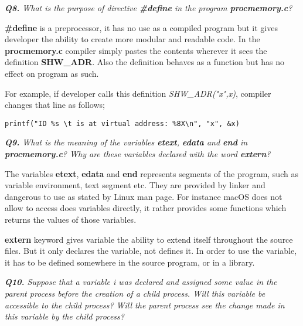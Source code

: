 \documentclass[11pt]{article}
\begin{document}
\vspace{5mm}
\textit{\textbf{Q8.} What is the purpose of directive \textbf{\#define} in the program \textbf{procmemory.c}?}
\vspace{5mm}

\textbf{\#define} is a preprocessor, it has no use as a compiled program but it gives developer the ability to create more modular and readable code. In the \textbf{procmemory.c} compiler simply pastes the contents wherever it sees the definition \textbf{SHW\_ADR}. Also the definition behaves as a function but has no effect on program as such.

For example, if developer calls this definition \textit{SHW\_ADR("x",x)}, compiler changes that line as follows; 

\begin{lstlisting}[frame=tlrb]
printf("ID %s \t is at virtual address: %8X\n", "x", &x)
\end{lstlisting}



\vspace{5mm}
\textit{\textbf{Q9.} What is the meaning of the variables \textbf{etext}, \textbf{edata} and \textbf{end} in \textbf{procmemory.c}? Why are these variables declared with the word \textbf{extern}?}
\vspace{3mm}

The variables \textbf{etext}, \textbf{edata} and \textbf{end} represents segments of the program, such as variable environment, text segment etc. They are provided by linker and dangerous to use as stated by Linux man page. For instance macOS does not allow to access does variables directly, it rather provides some functions which returns the values of those variables.

\textbf{extern} keyword gives variable the ability to extend itself throughout the source files. But it only declares the variable, not defines it. In order to use the variable, it has to be defined somewhere in the source program, or in a library.

\vspace{5mm}

\newpage

\textit{\textbf{Q10.} Suppose that a variable i was declared and assigned some value in the parent process before the creation of a child process. Will this variable be accessible to the child process? Will the parent process see the change made in this variable by the child process?}
\vspace{5mm}
\end{document}
